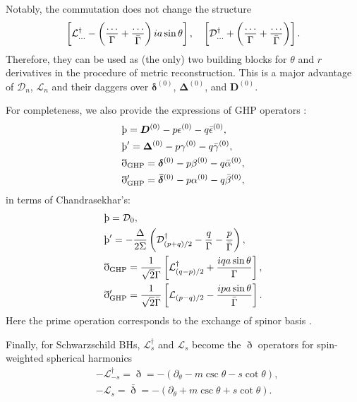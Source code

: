 \documentclass[aps,prd,amsmath,floats,floatfix, twocolumn,
superscriptaddress,nofootinbib,showpacs]{revtex4-1}
\begin{document}
Notably, the commutation does not change the structure 
\begin{align}
    \left[\mathcal{L}_{\ldots}^\dagger-\left(\frac{\ldots}{\Gamma}+\frac{\ldots}{\bar{\Gamma}}\right)ia\sin\theta\right], \quad     \left[\mathcal{D}_{\ldots}^\dagger+\left(\frac{\ldots}{\Gamma}+\frac{\ldots}{\bar{\Gamma}}\right)\right]. \notag 
\end{align}
Therefore, they can be used as (the only) two building blocks for $\theta$ and $r$ derivatives in the procedure of metric reconstruction. This is a major advantage of $\mathcal{D}_n$, $\mathcal{L}_n$ and their daggers over $\bm{\delta}^{(0)}$, $\bm{\Delta}^{(0)}$, and $\bm{D}^{(0)}$.

For completeness, we also provide the expressions of GHP operators \cite{penrose1984spinors}: 
\begin{equation}
\begin{aligned}
    &\text{\thorn}=\bm{D}^{(0)}-p\epsilon^{(0)}-q\bar{\epsilon}^{(0)},\\
    &\text{\thorn}^\prime=\bm{\Delta}^{(0)}-p\gamma^{(0)}-q\bar{\gamma}^{(0)}, \\
    &\eth_{\rm GHP}=\bm{\delta}^{(0)}-p\beta^{(0)}-q\bar{\alpha}^{(0)},\\
    &\eth^\prime_{\rm GHP}=\bm{\bar{\delta}}^{(0)}-p\alpha^{(0)}-q\bar{\beta}^{(0)},
\end{aligned} 
\end{equation}
in terms of Chandrasekhar's:
\begin{equation}
\begin{aligned}
    &\text{\thorn}=\mathcal{D}_0,\\
    &\text{\thorn}^\prime=-\frac{\Delta}{2\Sigma}\left(\mathcal{D}^\dagger_{(p+q)/2}-\frac{q}{\Gamma}-\frac{p}{\bar{\Gamma}}\right), \\
    &\eth_{\rm GHP}=\frac{1}{\sqrt{2}\Gamma}\left[\mathcal{L}^\dagger_{(q-p)/2}+\frac{iqa\sin\theta}{\Gamma}\right],\\
    &\eth^\prime_{\rm GHP}=\frac{1}{\sqrt{2}\bar{\Gamma}}\left[\mathcal{L}_{(p-q)/2}-\frac{ipa\sin\theta}{\bar{\Gamma}}\right].
\end{aligned} 
\end{equation}
Here the prime operation corresponds to the exchange of spinor basis \cite{penrose1984spinors}. 

Finally, for Schwarzschild BHs, $\mathcal{L}^\dagger_{s}$ and $\mathcal{L}_{s}$ become the $\eth$ operators for spin-weighted spherical harmonics
\begin{equation}
\label{eq:chan_L_vs_eth}
\begin{aligned}
    &-\mathcal{L}^\dagger_{-s}=\eth =-\left(\partial_\theta-m\csc\theta-s\cot\theta\right),  \\
    &-\mathcal{L}_s=\bar{\eth}=-\left(\partial_\theta+m\csc\theta+s\cot\theta\right).  
\end{aligned}
\end{equation}
\end{document}
